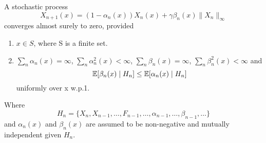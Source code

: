\begin{lemma}\label{norm lemma}
    A stochastic process
    \[
        X_{n+1}(x)=(1-\alpha_n(x))X_n(x)+\gamma\beta_n(x)\|X_n\|_\infty
    \]
    converges almost surely to zero, provided
    \begin{enumerate}
        \item \(x\in S\), where S is a finite set.
        \item \(\sum_n \alpha_n(x)=\infty\), \(\sum_n \alpha_n^2(x) <\infty\), \(\sum_n\beta_n(x)=\infty\), \(\sum_n \beta_n^2 (x)<\infty\) and
        \[
            \mathbb{E}[\beta_n(x)\mid H_n]\le \mathbb{E}[\alpha_n(x)\mid H_n]
        \]
        uniformly over x w.p.1.
    \end{enumerate}
    Where 
    \[
        H_n=\{X_n, X_{n-1}, \dots, F_{n-1}, \dots, \alpha_{n-1},\dots, \beta_{n-1},\dots\}
    \]
    and \(\alpha_n(x)\) and \(\beta_n(x)\) are assumed to be non-negative and mutually independent given \(H_n\).
\end{lemma}

